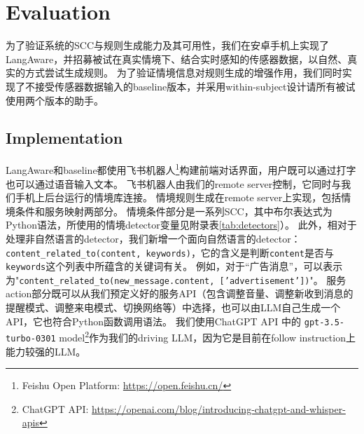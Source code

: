



\section{Evaluation}



为了验证系统的SCC与规则生成能力及其可用性，我们在安卓手机上实现了LangAware，并招募被试在真实情境下、结合实时感知的传感器数据，以自然、真实的方式尝试生成规则。
为了验证情境信息对规则生成的增强作用，我们同时实现了不接受传感器数据输入的baseline版本，并采用within-subject设计请所有被试使用两个版本的助手。

\subsection{Implementation}

LangAware和baseline都使用飞书机器人\footnote{Feishu Open Platform: \url{https://open.feishu.cn/}}构建前端对话界面，用户既可以通过打字也可以通过语音输入文本。
飞书机器人由我们的remote server控制，它同时与我们手机上后台运行的情境库连接。
情境规则生成在remote server上实现，包括情境条件和服务映射两部分。
情境条件部分是一系列SCC，其中布尔表达式为Python语法，所使用的情境detector变量见附录表\ref{tab:detectors}）。
此外，相对于处理非自然语言的detector，我们新增一个面向自然语言的detector：\texttt{content\_related\_to(content, keywords)}，它的含义是判断\texttt{content}是否与\texttt{keywords}这个列表中所蕴含的关键词有关。
例如，对于“广告消息”，可以表示为"\texttt{content\_related\_to(new\_message.content, ['advertisement'])}"。
服务action部分既可以从我们预定义好的服务API（包含调整音量、调整新收到消息的提醒模式、调整来电模式、切换网络等）中选择，也可以由LLM自己生成一个API，它也符合Python函数调用语法。
我们使用ChatGPT API 中的 \texttt{gpt-3.5-turbo-0301} model\footnote{ChatGPT API: \url{https://openai.com/blog/introducing-chatgpt-and-whisper-apis}}作为我们的driving LLM，因为它是目前在follow instruction上能力较强的LLM。

